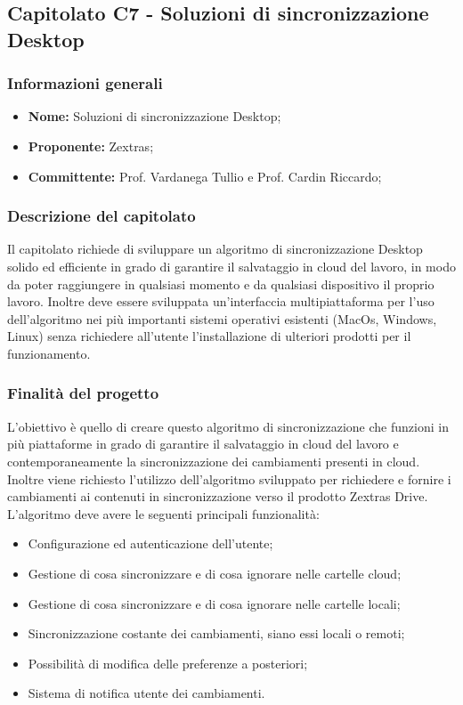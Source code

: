 \subsection{Capitolato C7 - Soluzioni di sincronizzazione Desktop}
\subsubsection{Informazioni generali}
	\begin{itemize}
	\item \textbf{Nome:} Soluzioni di sincronizzazione Desktop;
	\item \textbf{Proponente:} Zextras;
	\item \textbf{Committente:}  Prof. Vardanega Tullio e Prof. Cardin Riccardo;
	\end{itemize}
\subsubsection{Descrizione del capitolato}
Il capitolato richiede di sviluppare un algoritmo di sincronizzazione Desktop solido ed efficiente in grado di garantire il salvataggio in cloud del lavoro, in modo da poter raggiungere in qualsiasi momento e da qualsiasi dispositivo il proprio lavoro. Inoltre deve essere sviluppata un'interfaccia multipiattaforma per l'uso dell'algoritmo nei più importanti sistemi operativi esistenti (MacOs, Windows, Linux) senza richiedere all'utente l'installazione di ulteriori prodotti per il funzionamento.
\subsubsection{Finalità del progetto}
L'obiettivo è quello di creare questo algoritmo di sincronizzazione che funzioni in più piattaforme in grado di garantire il salvataggio in cloud del lavoro e contemporaneamente la sincronizzazione dei cambiamenti presenti in cloud. Inoltre viene richiesto l'utilizzo dell’algoritmo sviluppato per richiedere e fornire i cambiamenti ai contenuti in sincronizzazione verso il prodotto Zextras Drive.
L'algoritmo deve avere le seguenti principali funzionalità:
\begin{itemize}
\item {Configurazione ed autenticazione dell’utente};
\item {Gestione di cosa sincronizzare e di cosa ignorare nelle cartelle cloud};
\item {Gestione di cosa sincronizzare e di cosa ignorare nelle cartelle locali};
\item {Sincronizzazione costante dei cambiamenti, siano essi locali o remoti};
\item {Possibilità di modifica delle preferenze a posteriori};
\item {Sistema di notifica utente dei cambiamenti}.
\end{itemize}
